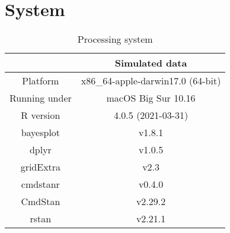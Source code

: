\section{System}

\begin{table}[H] 
\centering
\caption{Processing system}
\begin{tabular}{c|c}
\toprule
 & \bf Simulated data \\
\hline
Platform & x86\_64-apple-darwin17.0 (64-bit) \\
\hline
Running under & macOS Big Sur 10.16 \\
\hline
R version & 4.0.5 (2021-03-31) \\
\hline
bayesplot & v1.8.1\\
dplyr & v1.0.5\\
gridExtra & v2.3\\
cmdstanr & v0.4.0\\
CmdStan & v2.29.2\\
rstan & v2.21.1\\

\bottomrule
\end{tabular}

\end{table}